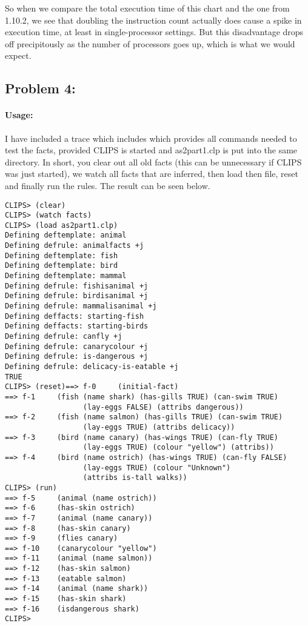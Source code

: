 \documentclass[a4paper]{article}
\begin{document}
So when we compare the total execution time of this chart and the one from 1.10.2, we see that doubling the instruction count actually does cause a spike in execution time, at least in single-processor settings. But this disadvantage drops off precipitously as the number of processors goes up, which is what we would expect.

\subsection*{Problem 4:}


\paragraph*{Usage:}
I have included a trace which includes which provides all commands needed to test the facts, provided CLIPS is started and as2part1.clp is put into the same directory. In short, you clear out all old facts (this can be unnecessary if CLIPS was just started), we watch all facts that are inferred, then load then file, reset and finally run the rules. The result can be seen below.
\begin{Verbatim}[fontsize=\small]
CLIPS> (clear)
CLIPS> (watch facts)
CLIPS> (load as2part1.clp)
Defining deftemplate: animal
Defining defrule: animalfacts +j
Defining deftemplate: fish
Defining deftemplate: bird
Defining deftemplate: mammal
Defining defrule: fishisanimal +j
Defining defrule: birdisanimal +j
Defining defrule: mammalisanimal +j
Defining deffacts: starting-fish
Defining deffacts: starting-birds
Defining defrule: canfly +j
Defining defrule: canarycolour +j
Defining defrule: is-dangerous +j
Defining defrule: delicacy-is-eatable +j
TRUE
CLIPS> (reset)==> f-0     (initial-fact)
==> f-1     (fish (name shark) (has-gills TRUE) (can-swim TRUE) 
                  (lay-eggs FALSE) (attribs dangerous))
==> f-2     (fish (name salmon) (has-gills TRUE) (can-swim TRUE) 
                  (lay-eggs TRUE) (attribs delicacy))
==> f-3     (bird (name canary) (has-wings TRUE) (can-fly TRUE) 
                  (lay-eggs TRUE) (colour "yellow") (attribs))
==> f-4     (bird (name ostrich) (has-wings TRUE) (can-fly FALSE) 
                  (lay-eggs TRUE) (colour "Unknown") 
                  (attribs is-tall walks))
CLIPS> (run)
==> f-5     (animal (name ostrich))
==> f-6     (has-skin ostrich)
==> f-7     (animal (name canary))
==> f-8     (has-skin canary)
==> f-9     (flies canary)
==> f-10    (canarycolour "yellow")
==> f-11    (animal (name salmon))
==> f-12    (has-skin salmon)
==> f-13    (eatable salmon)
==> f-14    (animal (name shark))
==> f-15    (has-skin shark)
==> f-16    (isdangerous shark)
CLIPS> \end{Verbatim}
\end{document}
